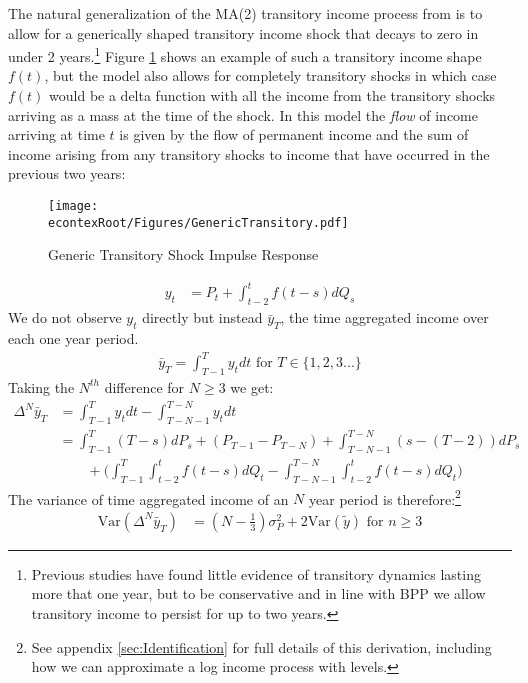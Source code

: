 \documentclass[titlepage]{\econtex}\newcommand{\texname}{ConsumptionHeterogeneity}
\begin{document}
The natural generalization of the MA(2) transitory income process from \cite{carroll_nature_1997} is to allow for a generically shaped transitory income shock that decays to zero in under 2 years.\footnote{Previous studies have found little evidence of transitory dynamics lasting more that one year, but to be conservative and in line with BPP we allow transitory income to persist for up to two years.} Figure \ref{fig:GenericTransitory} shows an example of such a transitory income shape $f(t)$, but the model also allows for completely transitory shocks in which case $f(t)$ would be a delta function with all the income from the transitory shocks arriving as a mass at the time of the shock. In this model the \textit{flow} of income arriving at time $t$ is given by the flow of permanent income and the sum of income arising from any transitory shocks to income that have occurred in the previous two years:
\begin{figure} 
	\begin{centering}
		\texttt{[image: \\econtexRoot/Figures/GenericTransitory.pdf]} 
		\caption{Generic Transitory Shock Impulse Response}
		\label{fig:GenericTransitory}
	\end{centering}
\end{figure}
\begin{align*}
y_t &= P_t + \int_{t-2}^{t} f(t-s)dQ_s
\end{align*}
We do not observe $y_t$ directly but instead $\bar{y}_T$, the time aggregated income over each one year period.
\begin{align}
\bar{y}_T = \int_{T-1}^{T} y_t dt \text{   for } T \in \{1,2,3...\}\label{income_TA}
\end{align}
Taking the $N^{th}$ difference for $N \geq 3$ we get:
\begin{align}
\Delta^N \bar{y}_T &= \int_{T-1}^{T} y_t dt  - \int_{T-N-1}^{T-N} y_t dt  \nonumber \\ 
&= \int_{T-1}^{T} (T-s)dP_s  + (P_{T-1} - P_{T-N}) + \int_{T-N-1}^{T-N} (s-(T-2))dP_s \nonumber \\
& \qquad + \Big(\int_{T-1}^{T} \int_{t-2}^{t} f(t-s)dQ_t -\int_{T-N-1}^{T-N}\int_{t-2}^{t} f(t-s) dQ_t \Big) \label{deltaNy}
\end{align}
The variance of time aggregated income of an $N$ year period is therefore:\footnote{See appendix \ref{sec:Identification} for full details of this derivation, including how we can approximate a log income process  with levels.}
\begin{align}
\mathrm{Var}(\Delta^N \bar{y}_T) &= (N-\frac{1}{3})\sigma^2_P +  2 \mathrm{Var}(\tilde{y}) \text{   for }n \geq 3 \label{variance}
\end{align}
\end{document}
